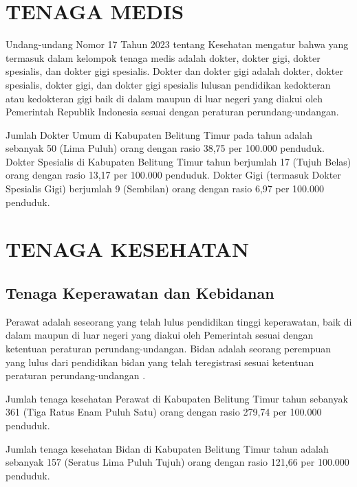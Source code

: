 \section{TENAGA MEDIS}
Undang-undang Nomor 17 Tahun 2023 tentang Kesehatan mengatur bahwa yang termasuk dalam kelompok tenaga medis adalah dokter, dokter gigi, dokter spesialis, dan dokter gigi spesialis.
Dokter dan dokter gigi adalah dokter, dokter spesialis, dokter gigi, dan dokter gigi spesialis lulusan pendidikan kedokteran atau kedokteran gigi baik di dalam maupun di luar negeri yang diakui oleh Pemerintah Republik Indonesia sesuai dengan peraturan perundang-undangan.

Jumlah Dokter Umum di Kabupaten Belitung Timur pada tahun \tP adalah sebanyak 50 (Lima Puluh) orang dengan rasio 38,75 per 100.000 penduduk.
Dokter Spesialis di Kabupaten Belitung Timur tahun \tP berjumlah 17 (Tujuh Belas) orang dengan rasio 13,17 per 100.000 penduduk.
Dokter Gigi (termasuk Dokter Spesialis Gigi) berjumlah 9 (Sembilan) orang dengan rasio 6,97 per 100.000 penduduk.

\section{TENAGA KESEHATAN}
\subsection{Tenaga Keperawatan dan Kebidanan}
Perawat adalah seseorang yang telah lulus pendidikan tinggi keperawatan, baik di dalam maupun di luar negeri yang diakui oleh Pemerintah sesuai dengan ketentuan peraturan perundang-undangan.
Bidan adalah seorang perempuan yang lulus dari pendidikan bidan yang telah teregistrasi sesuai ketentuan peraturan perundang-undangan .

Jumlah tenaga kesehatan Perawat di Kabupaten Belitung Timur tahun \tP sebanyak 361 (Tiga Ratus Enam Puluh Satu) orang dengan rasio 279,74 per 100.000 penduduk.

Jumlah tenaga kesehatan Bidan di Kabupaten Belitung Timur tahun \tP adalah sebanyak 157 (Seratus Lima Puluh Tujuh) orang dengan rasio 121,66 per 100.000 penduduk.

